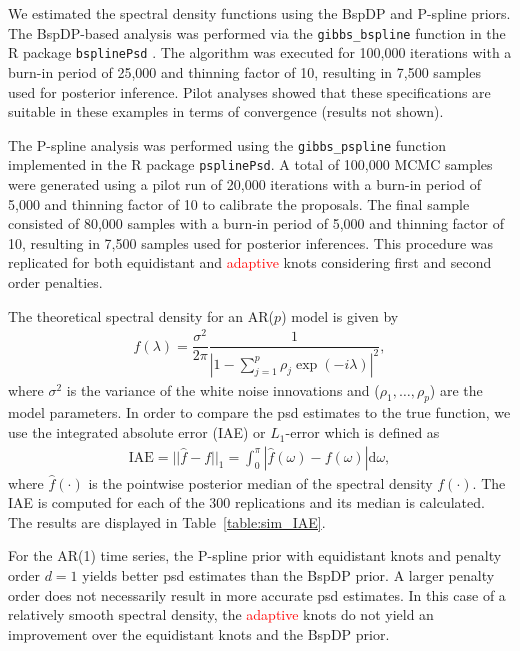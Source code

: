 \documentclass[twocolumn,final]{svjour3}
\newcommand{\pmr}{ \color{blue}}
\begin{document}
We estimated the spectral density functions using the BspDP and P-spline priors.  The BspDP-based  analysis was performed via the \texttt{gibbs\_bspline} function in the \textsf{R} package \texttt{bsplinePsd} \cite{Edwards:bsplinePsd:2018}.  The algorithm was executed for 100,000 iterations with a burn-in period of 25,000 and thinning factor of 10, resulting in 7,500 samples used for posterior inference.  Pilot analyses showed that these specifications are suitable in these examples in terms of convergence (results not shown).  

The P-spline analysis was performed using the \texttt{gibbs\_pspline} function implemented in the \textsf{R} package \texttt{psplinePsd}.  A total of 100,000 MCMC samples were generated
using  a pilot run of 20,000 iterations with a burn-in period of 5,000 and thinning factor of 10 to calibrate the proposals.  The final sample consisted of 80,000 samples with a burn-in period of 5,000 and thinning factor of 10, resulting in 7,500 samples used for posterior inferences.  
This procedure was replicated for both equidistant and \textcolor{red}{adaptive} knots{\pmr considering first and second order penalties.}

The theoretical spectral density for an AR($p$) model is given by
\begin{align*}
f(\lambda) = \dfrac{\sigma^2}{2 \pi} \dfrac{1}{|1-\sum_{j=1}^{p}\rho_j \exp(-i \lambda)|^2},
\end{align*}
where $\sigma^2$ is the variance of the white noise innovations and ($\rho_1, \dots, \rho_p$) are the model parameters.  In order to compare the psd estimates  to the true function, we use the integrated absolute error (IAE) or $L_1$-error which is defined as
\begin{align*}
\text{IAE} = || \widehat{f} - f ||_1 = \int_{0}^{\pi} |\widehat{f}(\omega)-f(\omega)|\text{d}\omega,
\end{align*}
where $\widehat{f}(\cdot)$ is the pointwise posterior median of the spectral density $f(\cdot)$.   The IAE is computed for each of the 300 replications and its median is calculated.  
The results are displayed in Table~\ref{table:sim_IAE}.

For the AR(1) time series, the P-spline prior with equidistant knots and penalty order $d=1$ yields better psd estimates than the BspDP prior.
A larger penalty order does not necessarily result in more accurate psd estimates. In this case of a relatively smooth spectral density, the \textcolor{red}{adaptive} knots do not yield an improvement over the equidistant knots and the BspDP prior.
\end{document}
